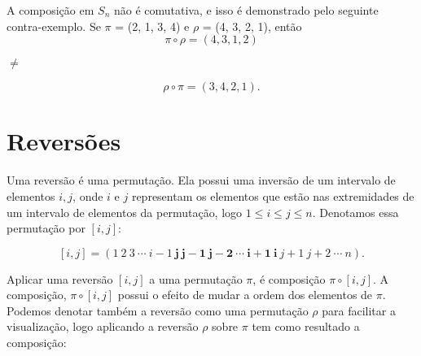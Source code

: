 

A composição em $S_n$ não é comutativa, e isso é demonstrado pelo seguinte contra-exemplo. Se $\pi$ = (2, 1, 3, 4) e $\rho$ = (4, 3, 2, 1), então
\[\pi \circ \rho = (4, 3, 1, 2)\]
\begin{center} $\neq$ \end{center}
\[\rho \circ \pi = (3, 4, 2, 1).\]

\section{Reversões}



Uma reversão é uma permutação. Ela possui uma inversão de um intervalo de elementos $i, j$, onde $i$ e $j$ representam os elementos que estão nas extremidades de um intervalo de elementos da permutação, logo $1 \leq i \leq j \leq n$. Denotamos essa permutação por $[i, j]$:



\[ [i, j] = (1 \ 2 \ 3 \ \cdots \ i-1 \ 
\boldsymbol{j \ j-1 \ j-2 \ \cdots \ i+1 \ i  }\ j+1 \ j+2 \ \cdots \ n).\]

 Aplicar uma reversão $[i, j]$ a uma permutação $\pi$, é composição $\pi \circ [i,j]$. A composição, $\pi \circ [i, j]$ possui o efeito de mudar a ordem dos elementos de $\pi$. Podemos denotar também a reversão como uma permutação $\rho$ para facilitar a visualização, logo aplicando a reversão $\rho$ sobre $\pi$ tem como resultado a composição:

